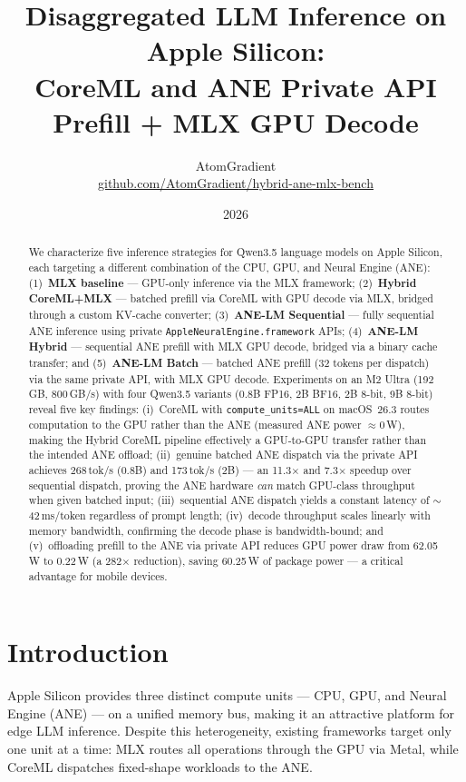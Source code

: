 \documentclass[11pt]{article}
\title{\textbf{Disaggregated LLM Inference on Apple Silicon:\\
       CoreML and ANE Private API Prefill + MLX GPU Decode}}
\author{%
  AtomGradient\\
  \small\href{https://github.com/AtomGradient/hybrid-ane-mlx-bench}{github.com/AtomGradient/hybrid-ane-mlx-bench}
}
\date{2026}
\begin{document}
\maketitle

\begin{abstract}
We characterize five inference strategies for Qwen3.5 language models on
Apple Silicon, each targeting a different combination of the CPU, GPU, and
Neural Engine (ANE):
(1)~\textbf{MLX baseline} --- GPU-only inference via the MLX framework;
(2)~\textbf{Hybrid CoreML+MLX} --- batched prefill via CoreML with GPU
decode via MLX, bridged through a custom KV-cache converter;
(3)~\textbf{ANE-LM Sequential} --- fully sequential ANE inference using
private \texttt{AppleNeuralEngine.framework} APIs;
(4)~\textbf{ANE-LM Hybrid} --- sequential ANE prefill with MLX GPU decode,
bridged via a binary cache transfer;
and (5)~\textbf{ANE-LM Batch} --- batched ANE prefill (32 tokens per
dispatch) via the same private API, with MLX GPU decode.
Experiments on an M2 Ultra (192\,GB, 800\,GB/s) with four Qwen3.5 variants
(0.8B FP16, 2B BF16, 2B 8-bit, 9B 8-bit) reveal five key findings:
(i)~CoreML with \texttt{compute\_units=ALL} on macOS~26.3 routes
computation to the GPU rather than the ANE (measured ANE power
$\approx$0\,W), making the Hybrid CoreML pipeline effectively a
GPU-to-GPU transfer rather than the intended ANE offload;
(ii)~genuine batched ANE dispatch via the private API achieves
268\,tok/s (0.8B) and 173\,tok/s (2B) --- an 11.3$\times$ and
7.3$\times$ speedup over sequential dispatch, proving the ANE
hardware \emph{can} match GPU-class throughput when given batched input;
(iii)~sequential ANE dispatch yields a constant latency of
$\sim$42\,ms/token regardless of prompt length;
(iv)~decode throughput scales linearly with memory bandwidth, confirming
the decode phase is bandwidth-bound;
and (v)~offloading prefill to the ANE via private API reduces GPU power
draw from 62.05\,W to 0.22\,W (a 282$\times$ reduction), saving
60.25\,W of package power --- a critical advantage for mobile devices.
\end{abstract}

\section{Introduction}
\label{sec:intro}

Apple Silicon provides three distinct compute units --- CPU, GPU, and Neural
Engine (ANE) --- on a unified memory bus, making it an attractive platform for
edge LLM inference.
Despite this heterogeneity, existing frameworks target only one unit at a
time: MLX routes all operations through the GPU via Metal, while CoreML
dispatches fixed-shape workloads to the ANE.
\end{document}
